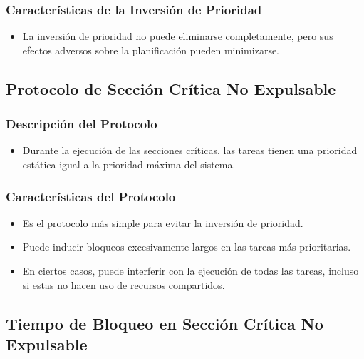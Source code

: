 \documentclass[a4paper,12pt]{article}
\begin{document}
\subsubsection{Características de la Inversión de Prioridad}

\begin{itemize}
    \item La inversión de prioridad no puede eliminarse completamente, pero sus efectos adversos sobre la planificación pueden minimizarse.
\end{itemize}

\subsection{Protocolo de Sección Crítica No Expulsable}

\subsubsection{Descripción del Protocolo}

\begin{itemize}
    \item Durante la ejecución de las secciones críticas, las tareas tienen una prioridad estática igual a la prioridad máxima del sistema.
\end{itemize}

\subsubsection{Características del Protocolo}

\begin{itemize}
    \item Es el protocolo más simple para evitar la inversión de prioridad.
    \item Puede inducir bloqueos excesivamente largos en las tareas más prioritarias.
    \item En ciertos casos, puede interferir con la ejecución de todas las tareas, incluso si estas no hacen uso de recursos compartidos.
\end{itemize}

\subsection{Tiempo de Bloqueo en Sección Crítica No Expulsable}
\end{document}
